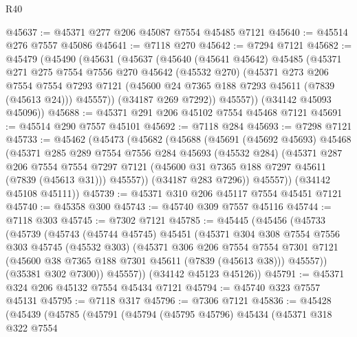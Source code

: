 \begin{lexlean}{R40}
\begin{coremodule}
@45637 := @45371 @277 @206 @45087 @7554 @45485 @7121
@45640 := @45514 @276 @7557 @45086
@45641 := @7118 @270
@45642 := @7294 @7121
@45682 := @45479
    (@45490
      (@45631
        (@45637
          (@45640
            (@45641 @45642)
            @45485
            (@45371
              @271
              @275
              @7554
              @7556
              @270
              @45642
              (@45532 @270)
              (@45371
                @273
                @206
                @7554
                @7554
                @7293
                @7121
                (@45600 @24 @7365 @188 @7293 @45611 (@7839 (@45613 @24)))
                @45557))
            (@34187 @269 @7292))
          @45557))
      (@34142 @45093 @45096))
@45688 := @45371 @291 @206 @45102 @7554 @45468 @7121
@45691 := @45514 @290 @7557 @45101
@45692 := @7118 @284
@45693 := @7298 @7121
@45733 := @45462
    (@45473
      (@45682
        (@45688
          (@45691
            (@45692 @45693)
            @45468
            (@45371
              @285
              @289
              @7554
              @7556
              @284
              @45693
              (@45532 @284)
              (@45371
                @287
                @206
                @7554
                @7554
                @7297
                @7121
                (@45600 @31 @7365 @188 @7297 @45611 (@7839 (@45613 @31)))
                @45557))
            (@34187 @283 @7296))
          @45557))
      (@34142 @45108 @45111))
@45739 := @45371 @310 @206 @45117 @7554 @45451 @7121
@45740 := @45358 @300
@45743 := @45740 @309 @7557 @45116
@45744 := @7118 @303
@45745 := @7302 @7121
@45785 := @45445
    (@45456
      (@45733
        (@45739
          (@45743
            (@45744 @45745)
            @45451
            (@45371
              @304
              @308
              @7554
              @7556
              @303
              @45745
              (@45532 @303)
              (@45371
                @306
                @206
                @7554
                @7554
                @7301
                @7121
                (@45600 @38 @7365 @188 @7301 @45611 (@7839 (@45613 @38)))
                @45557))
            (@35381 @302 @7300))
          @45557))
      (@34142 @45123 @45126))
@45791 := @45371 @324 @206 @45132 @7554 @45434 @7121
@45794 := @45740 @323 @7557 @45131
@45795 := @7118 @317
@45796 := @7306 @7121
@45836 := @45428
    (@45439
      (@45785
        (@45791
          (@45794
            (@45795 @45796)
            @45434
            (@45371
              @318
              @322
              @7554

\end{coremodule}
\end{lexlean}
